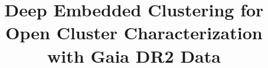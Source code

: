 \documentclass[preprint,12pt,authoryear]{elsarticle}
\begin{document}
\begin{frontmatter}



\title{Deep Embedded Clustering for Open Cluster Characterization with Gaia DR2 Data}












\end{frontmatter}
\end{document}
